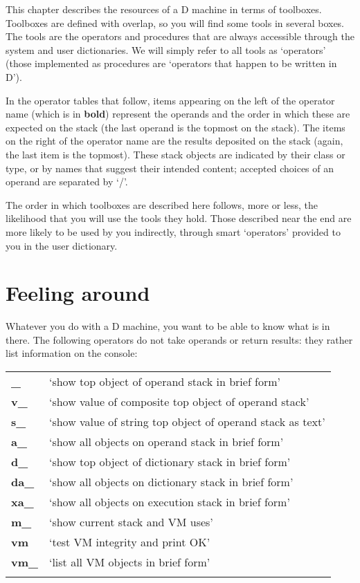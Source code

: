 This chapter describes the resources of a D machine in terms of toolboxes. Toolboxes are defined with overlap, so you will find some tools in several boxes. The tools are the operators and procedures that are always accessible through the system and user dictionaries. We will simply refer to all tools as `operators' (those implemented as procedures are `operators that happen to be written in D').

In the operator tables that follow, items appearing on the left of  the operator  name (which is in \textbf{bold}) represent the operands and the order  in which these are expected on the stack (the last operand is the topmost  on the stack). The items on the right of the operator name  are the results deposited on the stack (again,  the last item is the topmost). These stack objects are indicated by their class or type, or by names that suggest their intended content;  accepted choices of an operand are separated by `/'.

The order in which toolboxes are described here follows, more or less, the likelihood that you will use the tools they hold. Those described near the end are more likely to be used by you indirectly, through smart `operators' provided to you in the user dictionary. 

\section{Feeling around}

Whatever you do with a D machine, you want to be able to know what is in there. The following operators do not take operands or return results: they rather list information on the console:\\

\begin{tabular}{>{\sffamily\bfseries}l>{\normalfont}l}
\_   & `show top object of operand stack in brief form'\\
v\_  & `show value of composite top object of operand stack'\\
s\_  & `show value of string top object of operand stack as text'\\
a\_  & `show all objects on operand stack in brief form'\\
d\_  & `show top object of dictionary stack in brief form'\\
da\_ & `show all objects on dictionary stack in brief form'\\
xa\_ & `show all objects on execution stack in brief form'\\
m\_  & `show current stack and VM uses'\\
vm   & `test VM integrity and print OK'\\
vm\_ & `list all VM objects in brief form'\\\\
\end{tabular}

